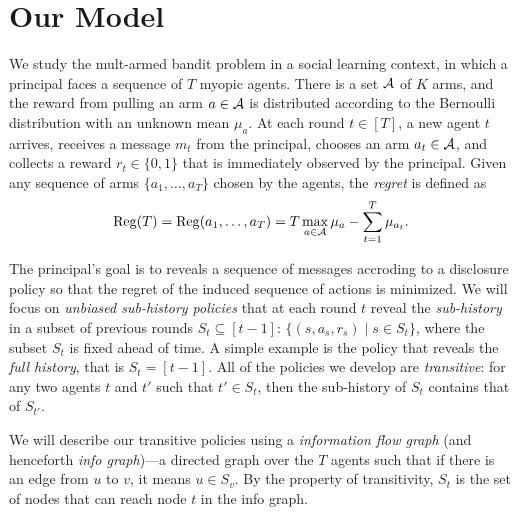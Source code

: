 \section{Our Model}
\label{sec:model}

We study the mult-armed bandit problem in a social learning context,
in which a principal faces a sequence of $T$ myopic agents. There is a
set $\mathcal{A}$ of $K$ arms, and the reward from pulling an arm $a\in \mathcal{A}$ is
distributed according to the Bernoulli distribution with an unknown
mean $\mu_a$.  
At each round $t\in [T]$, a new agent $t$ arrives, receives a message
$m_t$ from the principal, chooses an arm $a_t\in \mathcal{A}$, and collects a
reward $r_t\in \{0,1\}$ that is immediately observed by the
principal. Given any sequence of arms $\{a_1, \ldots, a_T\}$ chosen by
the agents, the \emph{regret} is defined as
\[
  \mathrm{Reg}(T)= \mathrm{Reg}(a_1, \ldots , a_T) = T \max_{a\in \mathcal{A}} \mu_a -
  \sum_{t=1}^T \mu_{a_t}.
\]





 The principal's goal is to reveals
a sequence of messages accroding to a disclosure policy so that the
regret of the induced sequence of actions is minimized. We will focus
on \emph{unbiased sub-history policies} that at each round $t$ reveal
the \emph{sub-history} in a subset of previous rounds
$S_t\subseteq [t-1]$: $\{(s, a_s, r_s)\mid s \in S_t\}$, where the
subset $S_t$ is fixed ahead of time. A simple example is the policy
that reveals the \emph{full history}, that is $S_t = [t-1]$.  All of
the policies we develop are \emph{transitive}: for any two agents $t$
and $t'$ such that $t'\in S_t$, then the sub-history of $S_t$ contains
that of $S_{t'}$.


 We will describe our transitive
policies using a \emph{information flow graph} (and henceforth
\emph{info graph})---a directed graph over the $T$ agents such that if
there is an edge from $u$ to $v$, it means $u\in S_v$. By the property
of transitivity, $S_t$ is the set of nodes that can reach node $t$ in
the info graph.

